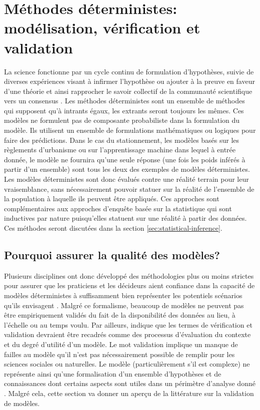 \section{Méthodes déterministes: modélisation, vérification et validation}\label{sec:deterministic-model-validation}
    La science fonctionne par un cycle continu de formulation d'hypothèses, suivie de diverses expériences visant à infirmer l'hypothèse ou ajouter à la preuve en faveur d'une théorie et ainsi rapprocher le savoir collectif de la communauté scientifique vers un consensus \parencite{box_science_1976,oreskes_verification_1994}. 
    Les méthodes déterministes sont un ensemble de méthodes qui supposent qu'à intrants égaux, les extrants seront toujours les mêmes. Ces modèles ne formulent pas de composante probabiliste dans la formulation du modèle. Ils utilisent un ensemble de formulations mathématiques ou logiques pour faire des prédictions. Dans le cas du stationnement, les modèles basés sur les règlements d'urbanisme \parencite{hoehne_valley_2019} ou sur l'apprentissage machine dans lequel à entrée donnée, le modèle ne fournira qu'une seule réponse (une fois les poids inférés à partir d'un ensemble) sont tous les deux des exemples de modèles déterministes. Les modèles déterministes sont donc évalués contre une réalité terrain pour leur vraisemblance, sans nécessairement pouvoir statuer sur la réalité de l'ensemble de la population à laquelle ils peuvent être appliqués. Ces approches sont complémentaires aux approches d'enquête basée sur la statistique qui sont inductives par nature puisqu'elles statuent sur une réalité à partir des données. Ces méthodes seront discutées dans la section \ref{sec:statistical-inference}.
    \subsection{Pourquoi assurer la qualité des  modèles?}
        Plusieurs disciplines ont donc développé des méthodologies plus ou moins strictes pour assurer que les praticiens et les décideurs aient confiance dans la capacité de modèles déterministes à suffisamment bien représenter les potentiels scénarios qu'ils envisagent \parencite{national_research_council_assessing_2012,national_research_council_behavioral_2008,transportation_research_board_travel_2012}. Malgré ce formalisme, beaucoup de modèles ne peuvent pas être empiriquement validés du fait de la disponibilité des données au lieu, à l'échelle ou au temps voulu. Par ailleurs, \textcite{oreskes_evaluation_1998} indique que les termes de vérification et validation devraient être recadrés comme des processus d'évaluation du contexte et du degré d'utilité d'un modèle. Le mot validation  implique un manque de failles au modèle qu'il n'est pas nécessairement possible de remplir pour les sciences sociales ou naturelles. Le modèle (particulièrement s'il est complexe) ne représente ainsi qu'une formalisation d'un ensemble d'hypothèses et de connaissances dont certains aspects sont utiles dans un périmètre d'analyse donné \parencite{oreskes_evaluation_1998}. Malgré cela, cette section va donner un aperçu de la littérature sur la validation de modèles.
        
